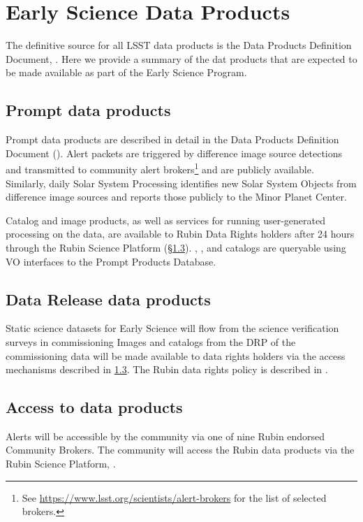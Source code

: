 \section{Early Science Data Products} 
\label{sec:data}

The definitive source for all LSST data products is the Data Products Definition Document, \citep{LSE-163}.
Here we provide a summary of the dat products that are expected to be made available as part of the Early Science Program. 

\subsection{Prompt data products}

Prompt data products are described in detail in the Data Products Definition Document (\DPDD).
Alert packets are triggered by difference image source detections and transmitted to community alert brokers\footnote{See \url{https://www.lsst.org/scientists/alert-brokers} for the list of selected brokers.} and are publicly available. 
Similarly, daily Solar System Processing identifies new Solar System Objects from difference image sources and reports those publicly to the Minor Planet Center.

Catalog and image products, as well as services for running user-generated processing on the data, are available to Rubin Data Rights holders after 24 hours through the Rubin Science Platform (\S \ref{ssec:dataaccess}).
\DIASource, \DIAObject, and \SSObject catalogs are queryable using VO interfaces to the Prompt Products Database.



\subsection{Data Release data products}
Static science datasets for Early Science will flow from the science verification surveys in commissioning
Images and catalogs from the DRP of the commissioning data will be made available to data rights holders via the access mechanisms described in \ref{ssec:dataaccess}.
The Rubin data rights policy is described in  \cite{RDO-013}.


\subsection{Access to \es data products}\label{ssec:dataaccess}
Alerts will be accessible by the community via one of nine Rubin endorsed Community Brokers. 
The community will access the Rubin data products via the Rubin Science Platform, \citep{LSE-319}.


